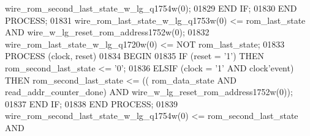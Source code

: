\begin{DoxyCode}
{{      wire_rom_second_last_state_w_lg_q1754w}\textcolor{vhdlchar}{(}\textcolor{vhdllogic}{}\textcolor{vhdllogic}{0}\textcolor{vhdlchar}{)};
01829         \textcolor{keywordflow}{END} \textcolor{keywordflow}{IF};
01830     \textcolor{keywordflow}{END} \textcolor{keywordflow}{PROCESS};
01831     \textcolor{vhdlchar}{wire_rom_last_state_w_lg_q1753w}\textcolor{vhdlchar}{(}\textcolor{vhdllogic}{}\textcolor{vhdllogic}{0}\textcolor{vhdlchar}{)} \textcolor{vhdlchar}{<=} \textcolor{vhdlchar}{rom_last_state} \textcolor{keywordflow}{AND} \textcolor{vhdlchar}{
      wire_w_lg_reset_rom_address1752w}\textcolor{vhdlchar}{(}\textcolor{vhdllogic}{}\textcolor{vhdllogic}{0}\textcolor{vhdlchar}{)};
01832     \textcolor{vhdlchar}{wire_rom_last_state_w_lg_q1720w}\textcolor{vhdlchar}{(}\textcolor{vhdllogic}{}\textcolor{vhdllogic}{0}\textcolor{vhdlchar}{)} \textcolor{vhdlchar}{<=} \textcolor{keywordflow}{NOT} \textcolor{vhdlchar}{rom_last_state};
01833     \textcolor{keywordflow}{PROCESS} (clock, reset)
01834 \textcolor{vhdlkeyword}{    BEGIN}
01835         \textcolor{keywordflow}{IF} \textcolor{vhdlchar}{(}\textcolor{vhdlchar}{reset} \textcolor{vhdlchar}{=} \textcolor{vhdlchar}{'}\textcolor{vhdllogic}{}\textcolor{vhdllogic}{1}\textcolor{vhdlchar}{'}\textcolor{vhdlchar}{)} \textcolor{keywordflow}{THEN} \textcolor{vhdlchar}{rom_second_last_state} \textcolor{vhdlchar}{<=} \textcolor{vhdlchar}{'}\textcolor{vhdllogic}{}\textcolor{vhdllogic}{0}\textcolor{vhdlchar}{'};
01836         \textcolor{keywordflow}{ELSIF} \textcolor{vhdlchar}{(}\textcolor{vhdlchar}{clock} \textcolor{vhdlchar}{=} \textcolor{vhdlchar}{'}\textcolor{vhdllogic}{}\textcolor{vhdllogic}{1}\textcolor{vhdlchar}{'} \textcolor{keywordflow}{AND} \textcolor{vhdlchar}{clock}\textcolor{vhdlchar}{'}\textcolor{vhdlkeyword}{event}\textcolor{vhdlchar}{)} \textcolor{keywordflow}{THEN} \textcolor{vhdlchar}{rom_second_last_state} \textcolor{vhdlchar}{<=} \textcolor{vhdlchar}{(}\textcolor{vhdlchar}{(}\textcolor{vhdlchar}{
      rom_data_state} \textcolor{keywordflow}{AND} \textcolor{vhdlchar}{read_addr_counter_done}\textcolor{vhdlchar}{)} \textcolor{keywordflow}{AND} \textcolor{vhdlchar}{wire_w_lg_reset_rom_address1752w}\textcolor{vhdlchar}{(}\textcolor{vhdllogic}{}\textcolor{vhdllogic}{0}\textcolor{vhdlchar}{)}\textcolor{vhdlchar}{)};
01837         \textcolor{keywordflow}{END} \textcolor{keywordflow}{IF};
01838     \textcolor{keywordflow}{END} \textcolor{keywordflow}{PROCESS};
01839     \textcolor{vhdlchar}{wire_rom_second_last_state_w_lg_q1754w}\textcolor{vhdlchar}{(}\textcolor{vhdllogic}{}\textcolor{vhdllogic}{0}\textcolor{vhdlchar}{)} \textcolor{vhdlchar}{<=} \textcolor{vhdlchar}{rom_second_last_state} \textcolor{keywordflow}{AND} \textcolor{vhdlchar}{
}}
\end{DoxyCode}
